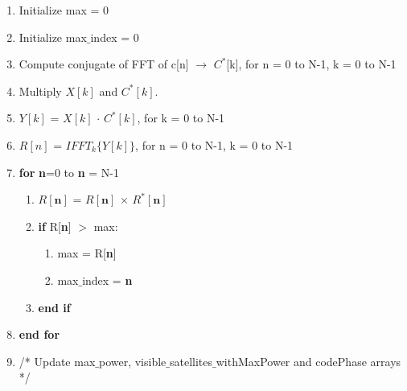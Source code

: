 \documentclass[journal,10pt,onecolumn]{article}
\begin{document}
\begin{enumerate}
    \begin{enumerate}
        \item[] Initialize max = 0
        \item[] Initialize max$\_$index = 0
        \item[] Compute  conjugate of FFT of c[n] $\longrightarrow$ $C^*$[k], for n = 0 to N-1, k = 0 to N-1 
        \item[] Multiply $X[k]$ and $C^*[k ]$.
        \item[] $Y[k]$ = $X[k]$ $\cdot$ $C^*[k]$, for k = 0 to N-1
        \item[] $R[n]$ =  $IFFT_k \{Y[k] \}$, for n = 0 to N-1, k = 0 to N-1
        \item[] \textbf{for} \textbf{n}=0 to \textbf{n} = N-1
        \begin{enumerate}
            \item[]  $R[\textbf{n}]$ = $R[\textbf{n}]$ $\times$ $R^*[\textbf{n}]$
            \item[] \textbf{if} R[\textbf{n}] $>$ max:
            \begin{enumerate}
                \item[] max = R[\textbf{n}]
                \item[] max$\_$index = \textbf{n}
            \end{enumerate}
           \item[] \textbf{end if}
        \end{enumerate}
        \item[] \textbf{end for} \\
      \item[] /* Update max$\_$power, visible$\_$satellites$\_$withMaxPower and codePhase arrays */ \\


\end{enumerate}
\end{enumerate}
\end{document}
